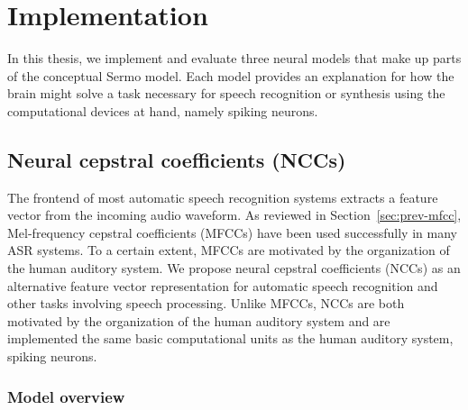 \chapter{Implementation}
\label{chapt:implementation}

In this thesis, we implement and evaluate
three neural models that make up
parts of the conceptual Sermo model.
Each model provides
an explanation for how the brain might
solve a task necessary for
speech recognition or synthesis
using the computational devices at hand,
namely spiking neurons.

\section{Neural cepstral coefficients (NCCs)}
\label{sec:ncc}


The frontend of most automatic speech recognition systems
extracts a feature vector from the incoming audio waveform.
As reviewed in Section~\ref{sec:prev-mfcc},
Mel-frequency cepstral coefficients (MFCCs)
have been used successfully in many ASR systems.
To a certain extent, MFCCs are motivated
by the organization of the human auditory system.
We propose neural cepstral coefficients (NCCs)
as an alternative feature vector representation
for automatic speech recognition
and other tasks involving speech processing.
Unlike MFCCs, NCCs are both motivated
by the organization of the human auditory system
and are implemented the same basic computational units
as the human auditory system, spiking neurons.

\subsection{Model overview}


